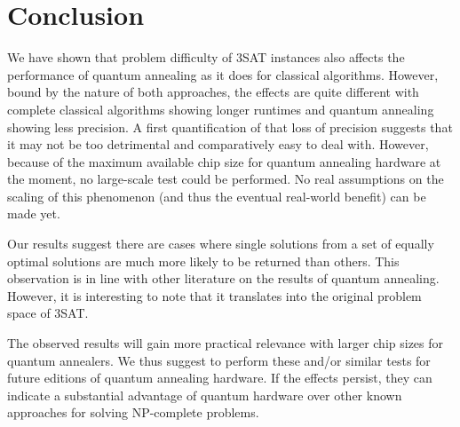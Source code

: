 \section{Conclusion}
\label{sec:conclusion}


We have shown that problem difficulty of 3SAT instances also affects the performance of quantum annealing as it does for classical algorithms. However, bound by the nature of both approaches, the effects are quite different with complete classical algorithms showing longer runtimes and quantum annealing showing less precision. A first quantification of that loss of precision suggests that it may not be too detrimental and comparatively easy to deal with. However, because of the maximum available chip size for quantum annealing hardware at the moment, no large-scale test could be performed. No real assumptions on the scaling of this phenomenon (and thus the eventual real-world benefit) can be made yet.

Our results suggest there are cases where single solutions from a set of equally optimal solutions are much more likely to be returned than others. This observation is in line with other literature on the results of quantum annealing. However, it is interesting to note that it translates into the original problem space of 3SAT.

The observed results will gain more practical relevance with larger chip sizes for quantum annealers. We thus suggest to perform these and/or similar tests for future editions of quantum annealing hardware. If the effects persist, they can indicate a substantial advantage of quantum hardware over other known approaches for solving NP-complete problems.
